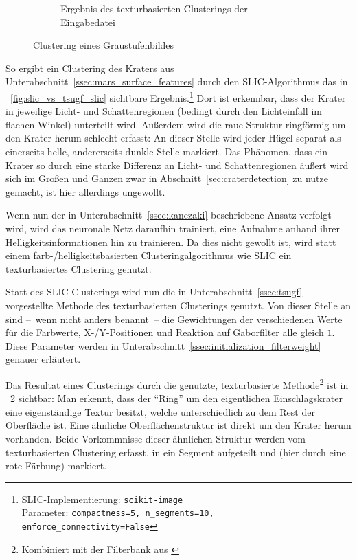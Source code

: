\begin{figure}[h!]
\begin{subfigure}[t]{0.32\textwidth}
		\captionsetup{format=plain,width=0.85\textwidth}
		\caption{Ergebnis des texturbasierten Clusterings der Eingabedatei}
		\label{fig:slic_vs_tsugf_tsugf}
	\end{subfigure}
	\caption{Clustering eines Graustufenbildes}
\end{figure}

So ergibt ein Clustering des Kraters aus Unterabschnitt~\ref{ssec:mars_surface_features} durch den SLIC-Algorithmus \cite{achanta_10} das in \figurename~\ref{fig:slic_vs_tsugf_slic} sichtbare Ergebnis.\footnote{SLIC-Implementierung: \texttt{scikit-image}\\Parameter: \texttt{compactness=5, n\_segments=10, enforce\_connectivity=False}} Dort ist erkennbar, dass der Krater in jeweilige Licht- und Schattenregionen (bedingt durch den Lichteinfall im flachen Winkel) unterteilt wird. Außerdem wird die raue Struktur ringförmig um den Krater herum schlecht erfasst: An dieser Stelle wird jeder Hügel separat als einerseits helle, andererseits dunkle Stelle markiert. Das Phänomen, dass ein Krater so durch eine starke Differenz an Licht- und Schattenregionen äußert wird sich im Großen und Ganzen zwar in Abschnitt~\ref{sec:craterdetection} zu nutze gemacht, ist hier allerdings ungewollt.

Wenn nun der in Unterabschnitt~\ref{ssec:kanezaki} beschriebene Ansatz verfolgt wird, wird das neuronale Netz daraufhin trainiert, eine Aufnahme anhand ihrer Helligkeitsinformationen hin zu trainieren. Da dies nicht gewollt ist, wird statt einem farb-/helligkeitsbasierten Clusteringalgorithmus wie SLIC ein texturbasiertes Clustering genutzt.

Statt des SLIC-Clusterings wird nun die in Unterabschnitt~\ref{ssec:tsugf} vorgestellte Methode des texturbasierten Clusterings genutzt. Von dieser Stelle an sind --~wenn nicht anders benannt~-- die Gewichtungen der verschiedenen Werte für die Farbwerte, X-/Y-Positionen und Reaktion auf Gaborfilter alle gleich $1$. Diese Parameter werden in Unterabschnitt~\ref{ssec:initialization_filterweight} genauer erläutert.

Das Resultat eines Clusterings durch die genutzte, texturbasierte Methode\footnote{Kombiniert mit der Filterbank aus \cite{jain_91}} ist in \figurename~\ref{fig:slic_vs_tsugf_tsugf} sichtbar: Man erkennt, dass der \enquote{Ring} um den eigentlichen Einschlagskrater eine eigenständige Textur besitzt, welche unterschiedlich zu dem Rest der Oberfläche ist. Eine ähnliche Oberflächenstruktur ist direkt um den Krater herum vorhanden. Beide Vorkommnisse dieser ähnlichen Struktur werden vom texturbasierten Clustering erfasst, in ein Segment aufgeteilt und (hier durch eine rote Färbung) markiert.

